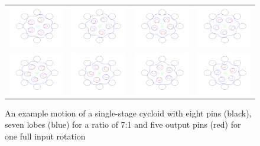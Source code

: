 \begin{figure}[h]
   \left
   \begin{tabular}{cccc}
     \includegraphics[width=0.24\linewidth]{fig/single_0} &
     \includegraphics[width=0.24\linewidth]{fig/single_1} &
     \includegraphics[width=0.24\linewidth]{fig/single_2} &
     \includegraphics[width=0.24\linewidth]{fig/single_3} \\
     \includegraphics[width=0.24\linewidth]{fig/single_4} &
     \includegraphics[width=0.24\linewidth]{fig/single_5} &
     \includegraphics[width=0.24\linewidth]{fig/single_6} &
     \includegraphics[width=0.24\linewidth]{fig/single_7} \\
   \end{tabular}
   \caption{An example motion of a single-stage cycloid with eight pins (black), seven lobes (blue) for a ratio of 7:1 and five output pins (red) for one full input rotation}
   \label{fig:single_motion}
\end{figure}

